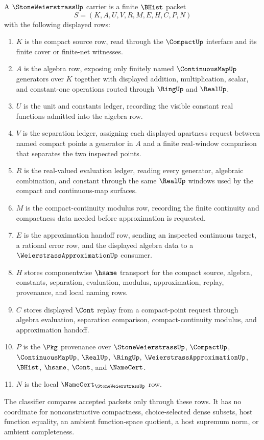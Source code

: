 \begin{definition}
\label{def:stone-weierstrass-carrier}
A $\StoneWeierstrassUp$ carrier is a finite $\BHist$ packet
$$
S=(K,A,U,V,R,M,E,H,C,P,N)
$$
with the following displayed rows:
\begin{enumerate}
\item $K$ is the compact source row, read through the $\CompactUp$ interface and its finite cover or finite-net witnesses.
\item $A$ is the algebra row, exposing only finitely named $\ContinuousMapUp$ generators over $K$ together with displayed addition, multiplication, scalar, and constant-one operations routed through $\RingUp$ and $\RealUp$.
\item $U$ is the unit and constants ledger, recording the visible constant real functions admitted into the algebra row.
\item $V$ is the separation ledger, assigning each displayed apartness request between named compact points a generator in $A$ and a finite real-window comparison that separates the two inspected points.
\item $R$ is the real-valued evaluation ledger, reading every generator, algebraic combination, and constant through the same $\RealUp$ windows used by the compact and continuous-map surfaces.
\item $M$ is the compact-continuity modulus row, recording the finite continuity and compactness data needed before approximation is requested.
\item $E$ is the approximation handoff row, sending an inspected continuous target, a rational error row, and the displayed algebra data to a $\WeierstrassApproximationUp$ consumer.
\item $H$ stores componentwise $\hsame$ transport for the compact source, algebra, constants, separation, evaluation, modulus, approximation, replay, provenance, and local naming rows.
\item $C$ stores displayed $\Cont$ replay from a compact-point request through algebra evaluation, separation comparison, compact-continuity modulus, and approximation handoff.
\item $P$ is the $\Pkg$ provenance over $\StoneWeierstrassUp$, $\CompactUp$, $\ContinuousMapUp$, $\RealUp$, $\RingUp$, $\WeierstrassApproximationUp$, $\BHist$, $\hsame$, $\Cont$, and $\NameCert$.
\item $N$ is the local $\NameCert_{\StoneWeierstrassUp}$ row.
\end{enumerate}
The classifier compares accepted packets only through these rows. It has no coordinate for nonconstructive compactness, choice-selected dense subsets, host function equality, an ambient function-space quotient, a host supremum norm, or ambient completeness.
\end{definition}


